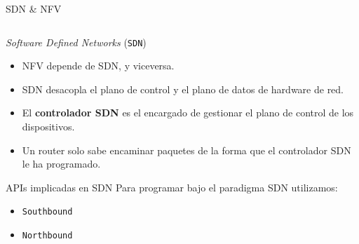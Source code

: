 \documentclass[aspectratio=169,xcolor=dvipsnames]{beamer}
\begin{document}
	\begin{frame}{SDN \& NFV}
        \begin{columns}
            \begin{column}{0.6\textwidth}
            \begin{alertblock}{\textit{Software Defined Networks} (\texttt{SDN})}
            \begin{itemize}
                \item NFV depende de SDN, y viceversa.
                \item SDN desacopla el plano de control y el plano de datos de hardware de red. 
                \item El \textbf{controlador SDN} es el encargado de gestionar el plano de control de los dispositivos.
                \item Un router solo sabe encaminar paquetes de la forma que el controlador SDN le ha programado.
            \end{itemize}
            \end{alertblock}
            
            \begin{block}{APIs implicadas en SDN}
                    Para programar bajo el paradigma SDN utilizamos:
                    \begin{itemize}
                        \item \texttt{Southbound}
                        \item \texttt{Northbound} 
                    \end{itemize}
            \end{block}
            \end{column}
            

\end{columns}
\end{frame}
\end{document}
